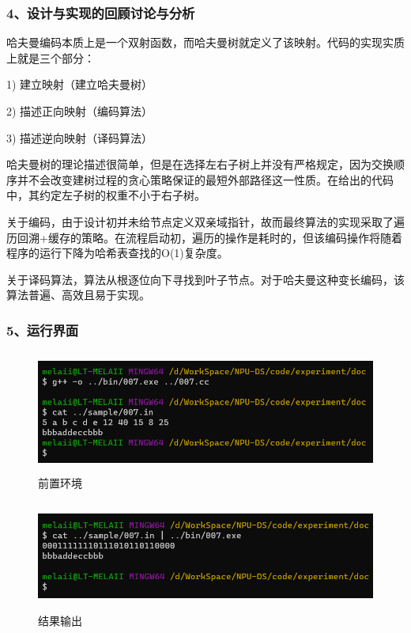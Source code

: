 \documentclass[UTF8, a4paper]{ctexart}
\begin{document}
\subsubsection*{4、设计与实现的回顾讨论与分析}
哈夫曼编码本质上是一个双射函数，而哈夫曼树就定义了该映射。代码的实现实质上就是三个部分： \par
1) 建立映射（建立哈夫曼树） \par
2) 描述正向映射（编码算法） \par
3) 描述逆向映射（译码算法） \par
哈夫曼树的理论描述很简单，但是在选择左右子树上并没有严格规定，因为交换顺序并不会改变建树过程的贪心策略保证的最短外部路径这一性质。在给出的代码中，其约定左子树的权重不小于右子树。 \par
关于编码，由于设计初并未给节点定义双亲域指针，故而最终算法的实现采取了遍历回溯+缓存的策略。在流程启动初，遍历的操作是耗时的，但该编码操作将随着程序的运行下降为哈希表查找的O(1)复杂度。 \par
关于译码算法，算法从根逐位向下寻找到叶子节点。对于哈夫曼这种变长编码，该算法普遍、高效且易于实现。 \par
\subsubsection*{5、运行界面}
\begin{figure}[H]
	\begin{minipage}[t]{\linewidth}
		\centering
		\includegraphics[width=125mm,height=40mm]{./assets/DS07-2}
		\caption{前置环境}
	\end{minipage}
\end{figure}
\begin{figure}[H]
	\begin{minipage}[t]{\linewidth}
		\centering
		\includegraphics[width=125mm,height=36mm]{./assets/DS07-3}
		\caption{结果输出}
	\end{minipage}
\end{figure}
\end{document}
